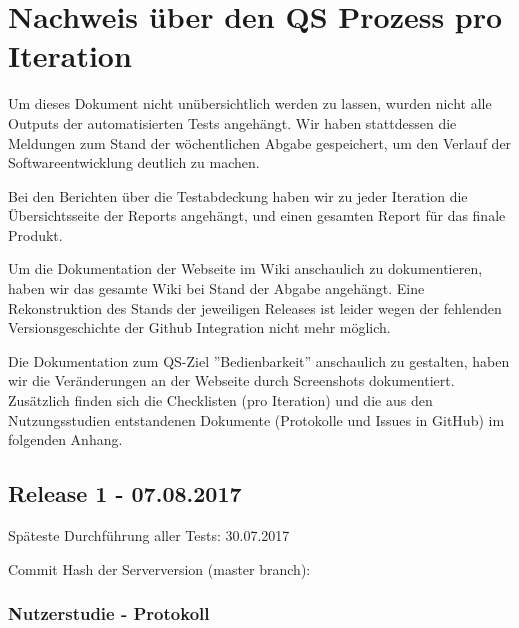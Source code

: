 \documentclass[accentcolor=tud0b,12pt,paper=a4]{tudreport}
\begin{document}
\chapter{Nachweis über den QS Prozess pro Iteration}
Um dieses Dokument nicht unübersichtlich werden zu lassen, wurden nicht alle Outputs der automatisierten Tests angehängt. Wir haben stattdessen die Meldungen zum Stand der wöchentlichen Abgabe gespeichert, um den Verlauf der Softwareentwicklung deutlich zu machen.

Bei den Berichten über die Testabdeckung haben wir zu jeder Iteration die Übersichtsseite der Reports angehängt, und einen gesamten Report für das finale Produkt.

Um die Dokumentation der Webseite im Wiki anschaulich zu dokumentieren, haben wir das gesamte Wiki bei Stand der Abgabe angehängt. Eine Rekonstruktion des Stands der jeweiligen Releases ist leider wegen der fehlenden Versionsgeschichte der Github Integration nicht mehr möglich.

Die Dokumentation zum QS-Ziel ''Bedienbarkeit'' anschaulich zu gestalten, haben wir die Veränderungen an der Webseite durch Screenshots dokumentiert. Zusätzlich finden sich die Checklisten (pro Iteration) und die aus den Nutzungsstudien entstandenen Dokumente (Protokolle und Issues in GitHub) im folgenden Anhang.














	
\section*{Release 1 - 07.08.2017}
Späteste Durchführung aller Tests: 30.07.2017

Commit Hash der Serverversion (master branch): 

\subsection*{Nutzerstudie - Protokoll}

\end{document}
